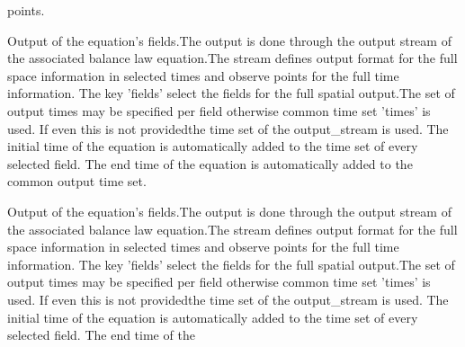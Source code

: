 \begin{RecordType}{}{}{}{}
{{{points.}}}\end{RecordType}\begin{RecordType}{}{}{}{}{{{Output of the equation's fields.The output is done through the output stream of the associated balance law equation.The stream defines output format for the full space information in selected times and observe points for the full time information. The key 'fields' select the fields for the full spatial output.The set of output times may be specified  per field otherwise common time set 'times' is used. If even this is not providedthe time set of the output\_stream is used. The initial time of the equation is automatically added to the time set of every selected field. The end time of the equation is automatically added to the common output time set.}}}\end{RecordType}\begin{RecordType}{}{}{}{}{{{Output of the equation's fields.The output is done through the output stream of the associated balance law equation.The stream defines output format for the full space information in selected times and observe points for the full time information. The key 'fields' select the fields for the full spatial output.The set of output times may be specified  per field otherwise common time set 'times' is used. If even this is not providedthe time set of the output\_stream is used. The initial time of the equation is automatically added to the time set of every selected field. The end time of the }}}
\end{RecordType}
